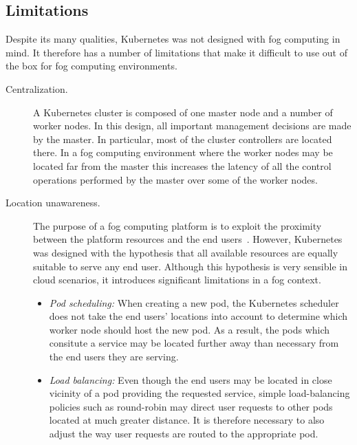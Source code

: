 \documentclass[letterpaper,twocolumn,10pt]{article}
\begin{document}
\subsection{Limitations}

Despite its many qualities, Kubernetes was not designed with fog
computing in mind. It therefore has a number of limitations that make
it difficult to use out of the box for fog computing environments.

\begin{description}
\item[Centralization.] A Kubernetes cluster is composed of one master
  node and a number of worker nodes. In this design, all important
  management decisions are made by the master. In particular, most of
  the cluster controllers are located there. In a fog computing
  environment where the worker nodes may be located far from the
  master this increases the latency of all the control operations
  performed by the master over some of the worker nodes.

\item[Location unawareness.]  The purpose of a fog computing platform
  is to exploit the proximity between the platform resources and the
  end users~\cite{bonomi2014}. However,
  Kubernetes was designed with the hypothesis that all available
  resources are equally suitable to serve any end user. Although this
  hypothesis is very sensible in cloud scenarios, it introduces
  significant limitations in a fog context.

  \begin{itemize}[leftmargin=*,itemsep=2pt,topsep=-3pt,labelsep=6pt]
  \item \emph{Pod scheduling:} When creating a new pod, the Kubernetes
    scheduler does not take the end users' locations into account to
    determine which worker node should host the new pod. As a result,
    the pods which consitute a service may be located further away
    than necessary from the end users they are serving.
  \item \emph{Load balancing:} Even though the end users may be
    located in close vicinity of a pod providing the requested
    service, simple load-balancing policies such as round-robin may
    direct user requests to other pods located at much greater
    distance. It is therefore necessary to also adjust the way user
    requests are routed to the appropriate pod.
  \end{itemize}
\end{description}
\end{document}

